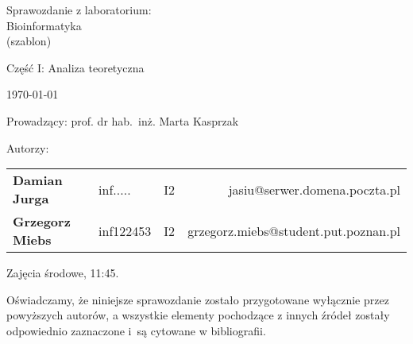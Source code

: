 \thispagestyle{empty} %

\begin{center}
{\large{Sprawozdanie z laboratorium:\\
Bioinformatyka\\
(szablon)}}

\vspace{3ex}

Część I: Analiza teoretyczna

\vspace{3ex}
{\footnotesize\today}

\end{center}


\vspace{10ex}

Prowadzący: prof. dr hab.~inż. Marta Kasprzak

\vspace{5ex}

Autorzy:
\begin{tabular}{lllr}
\textbf{Damian Jurga} & inf..... & I2 & jasiu@serwer.domena.poczta.pl \\
\textbf{Grzegorz Miebs} & inf122453 & I2 & grzegorz.miebs@student.put.poznan.pl \\
\end{tabular}

\vspace{5ex}

Zajęcia środowe, 11:45.

\vspace{35ex}

\noindent Oświadczamy, że niniejsze sprawozdanie zostało przygotowane wyłącznie przez powyższych autorów,
a wszystkie elementy pochodzące z innych źródeł zostały odpowiednio zaznaczone i~są cytowane w bibliografii.  

\newpage

